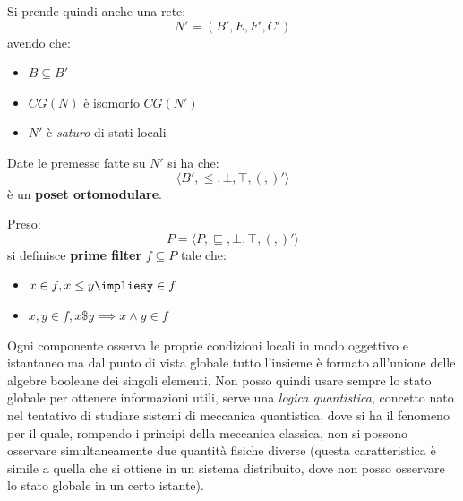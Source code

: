 \documentclass[a4paper,12pt, oneside]{book}
\begin{document}
Si prende quindi anche una rete:
\[N'=(B',E,F',C')\]
avendo che:
\begin{itemize}
  \item $B\subseteq B'$
  \item $CG(N)$ è isomorfo $CG(N')$
  \item $N'$ è \textit{saturo} di stati locali
\end{itemize}
\begin{teorema}
  Date le premesse fatte su $N'$ si ha che:
  \[\langle B', \leq, \bot,\top,(,)'  \rangle\]
  è un \textbf{poset ortomodulare}.
\end{teorema}
\begin{definizione}
  Preso:
  \[P=\langle P, \sqsubseteq, \bot,\top,(,)'  \rangle\]
  si definisce \textbf{prime filter} $f\subseteq P$ tale che:
  \begin{itemize}
    \item $x\in f, x\leq y\impliesy\in f$
    \item $x,y\in f, x\$y\implies x\land y\in f$
  \end{itemize}
\end{definizione}
Ogni componente osserva le proprie condizioni locali in modo oggettivo e
istantaneo ma dal punto di vista globale tutto l'insieme è formato all'unione
delle algebre booleane dei singoli elementi. Non posso quindi usare sempre lo
stato globale per ottenere informazioni utili, serve una \textit{logica
  quantistica}, concetto nato nel tentativo di studiare sistemi di meccanica
quantistica, dove si ha il fenomeno per il quale, rompendo i principi della
meccanica classica, non si possono osservare simultaneamente due quantità
fisiche diverse (questa caratteristica è simile a quella che si ottiene in un
sistema distribuito, dove non posso osservare lo stato globale in un certo
istante).   
\end{document}
